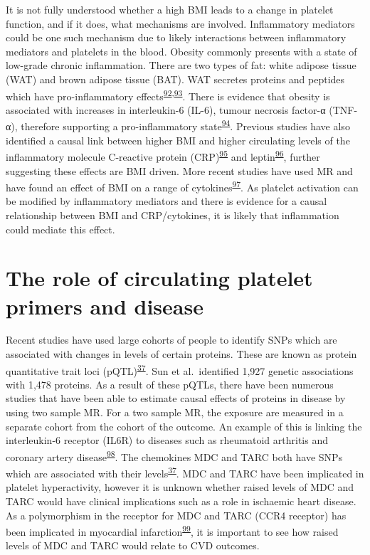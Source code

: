 \documentclass[11pt,twoside]{bristolthesis}
\begin{document}
It is not fully understood whether a high BMI leads to a change in platelet function, and if it does, what mechanisms are involved. Inflammatory mediators could be one such mechanism due to likely interactions between inflammatory mediators and platelets in the blood. Obesity commonly presents with a state of low-grade chronic inflammation. There are two types of fat: white adipose tissue (WAT) and brown adipose tissue (BAT). WAT secretes proteins and peptides which have pro-inflammatory effects\textsuperscript{\protect\hyperlink{ref-Cercato2019}{92},\protect\hyperlink{ref-Kern2001}{93}}. There is evidence that obesity is associated with increases in interleukin-6 (IL-6), tumour necrosis factor-α (TNF-α), therefore supporting a pro-inflammatory state\textsuperscript{\protect\hyperlink{ref-Esser2014}{94}}. Previous studies have also identified a causal link between higher BMI and higher circulating levels of the inflammatory molecule C-reactive protein (CRP)\textsuperscript{\protect\hyperlink{ref-Timpson2011}{95}} and leptin\textsuperscript{\protect\hyperlink{ref-Zaghlool2021}{96}}, further suggesting these effects are BMI driven. More recent studies have used MR and have found an effect of BMI on a range of cytokines\textsuperscript{\protect\hyperlink{ref-Kalaoja2021}{97}}. As platelet activation can be modified by inflammatory mediators and there is evidence for a causal relationship between BMI and CRP/cytokines, it is likely that inflammation could mediate this effect.

\hypertarget{the-role-of-circulating-platelet-primers-and-disease}{%
\section{The role of circulating platelet primers and disease}\label{the-role-of-circulating-platelet-primers-and-disease}}

Recent studies have used large cohorts of people to identify SNPs which are associated with changes in levels of certain proteins. These are known as protein quantitative trait loci (pQTL)\textsuperscript{\protect\hyperlink{ref-Sun2018}{37}}. Sun et al.~identified 1,927 genetic associations with 1,478 proteins. As a result of these pQTLs, there have been numerous studies that have been able to estimate causal effects of proteins in disease by using two sample MR. For a two sample MR, the exposure are measured in a separate cohort from the cohort of the outcome. An example of this is linking the interleukin-6 receptor (IL6R) to diseases such as rheumatoid arthritis and coronary artery disease\textsuperscript{\protect\hyperlink{ref-Bretherick2020}{98}}. The chemokines MDC and TARC both have SNPs which are associated with their levels\textsuperscript{\protect\hyperlink{ref-Sun2018}{37}}. MDC and TARC have been implicated in platelet hyperactivity, however it is unknown whether raised levels of MDC and TARC would have clinical implications such as a role in ischaemic heart disease. As a polymorphism in the receptor for MDC and TARC (CCR4 receptor) has been implicated in myocardial infarction\textsuperscript{\protect\hyperlink{ref-Noori2018}{99}}, it is important to see how raised levels of MDC and TARC would relate to CVD outcomes.
\end{document}
